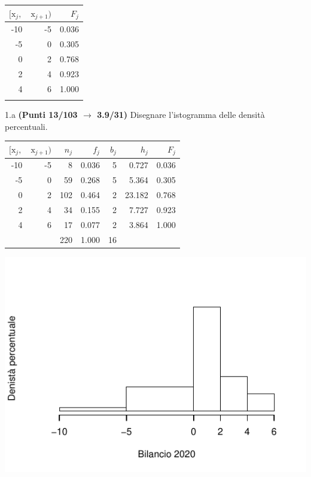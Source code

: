 \documentclass[
  11pt,
]{book}
\theoremstyle{mytheoremstyle}
\theoremstyle{mydefstyle}
\newenvironment{sol}
  {
  \begin{tcolorbox}[enhanced,breakable,arc=0.1mm,boxrule=1pt,colback=white,colframe=iblue,
  title=\bf \fontfamily{lmss}\selectfont \hspace{.5 cm} Soluzione,drop fuzzy shadow]

}{
\end{tcolorbox}
  }
\begin{document}
\begin{table}[H]
\centering
\begin{tabular}{rrr}
\toprule
$[\text{x}_j,$ & $\text{x}_{j+1})$ & $F_j$\\
\midrule
-10 & -5 & 0.036\\
-5 & 0 & 0.305\\
0 & 2 & 0.768\\
2 & 4 & 0.923\\
4 & 6 & 1.000\\
 &  & \\
\bottomrule
\end{tabular}
\end{table}

1.a \textbf{(Punti 13/103 \(\rightarrow\) 3.9/31)} Disegnare l'istogramma delle densità percentuali.

\begin{sol}

\begin{table}[H]
\centering
\begin{tabular}{rrrrrrr}
\toprule
$[\text{x}_j,$ & $\text{x}_{j+1})$ & $n_j$ & $f_j$ & $b_j$ & $h_j$ & $F_j$\\
\midrule
-10 & -5 & 8 & 0.036 & 5 & 0.727 & 0.036\\
-5 & 0 & 59 & 0.268 & 5 & 5.364 & 0.305\\
0 & 2 & 102 & 0.464 & 2 & 23.182 & 0.768\\
2 & 4 & 34 & 0.155 & 2 & 7.727 & 0.923\\
4 & 6 & 17 & 0.077 & 2 & 3.864 & 1.000\\
 &  & 220 & 1.000 & 16 &  & \\
\bottomrule
\end{tabular}
\end{table}

\begin{center}\includegraphics{Esami_passati_con_soluzioni_files/figure-latex/2022-95-1} \end{center}

\end{sol}
\end{document}
